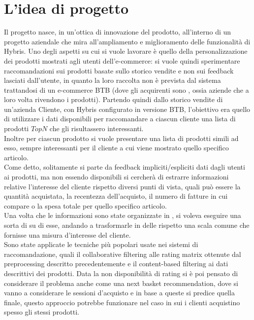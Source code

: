 \section{L'idea di progetto}
Il progetto nasce, in un'ottica di innovazione del prodotto, all'interno di un progetto aziendale che mira all'ampliamento e miglioramento delle funzionalità di Hybris. Uno degli aspetti su cui si vuole lavorare è quello della personalizzazione dei prodotti mostrati agli utenti dell'e-commerce: si vuole quindi sperimentare raccomandazioni sui prodotti basate sullo storico vendite e non sui feedback lasciati dall'utente, in quanto la loro raccolta non è prevista dal sistema trattandosi di un e-commerce BTB (dove gli acquirenti sono , ossia aziende che a loro volta rivendono i prodotti).
Partendo quindi dallo storico vendite di un'azienda Cliente, con Hybris configurato in versione BTB, l'obiettivo era quello di utilizzare i dati disponibili per raccomandare a ciascun cliente una lista di prodotti $TopN$ che gli risultassero interessanti.\\ 
Inoltre per ciascun prodotto si vuole presentare una lista di prodotti simili ad esso, sempre interessanti per il cliente a cui viene mostrato quello specifico articolo.\\
Come detto, solitamente si parte da feedback impliciti/espliciti dati dagli utenti ai prodotti, ma non essendo disponibili si cercherà di estrarre informazioni relative l'interesse del cliente rispetto diversi punti di vista, quali può essere la quantità acquistata, la recentezza dell'acquisto, il numero di fatture in cui compare o la spesa totale per quello specifico articolo.\\
Una volta che le informazioni sono state organizzate in , si voleva eseguire una sorta di  su di esse, andando a trasformarle in delle  rispetto una scala comune che fornisse una misura d'interesse del cliente.\\
Sono state applicate le tecniche più popolari usate nei sistemi di raccomandazione, quali il collaborative filtering alle rating matrix ottenute dal preprocessing descritto precedentemente e il content-based filtering ai dati descrittivi dei prodotti.
Data la non disponibilità di rating si è poi pensato di considerare il problema anche come una next basket recommendation, dove si vanno a considerare le sessioni d'acquisto e in base a queste si predice quella finale, questo approccio potrebbe funzionare nel caso in sui i clienti acquistino spesso gli stessi prodotti.

